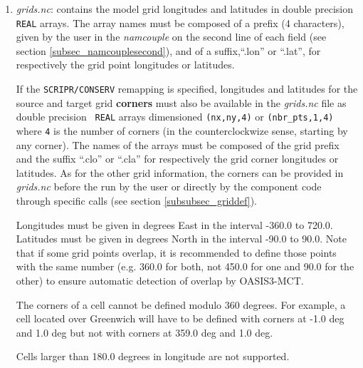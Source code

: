 \begin{enumerate}

\item {\em grids.nc}: contains the model grid longitudes and latitudes
  in double precision {\tt REAL} arrays. The array names must be
  composed of a prefix (4 characters), given by the user in the {\it
    namcouple} on the second line of each field (see section
  \ref{subsec_namcouplesecond}), and of a suffix,``.lon'' or ``.lat'', for respectively the grid point
  longitudes or latitudes.

  If the {\tt SCRIPR/CONSERV} remapping is specified, longitudes and
  latitudes for the source and target grid {\bf corners} must also be
  available in the {\em grids.nc} file as double precision {\tt
    REAL} arrays dimensioned {\tt (nx,ny,4)} or {\tt (nbr\_pts,1,4)}
  where {\tt 4} is the number of corners (in the counterclockwize
  sense, starting by any corner). The names of the arrays must be composed of the grid prefix
  and the suffix ``.clo'' or ``.cla'' for respectively the grid corner
  longitudes or latitudes.  As for the other grid information, the
  corners can be provided in {\em grids.nc} before the run by the user
  or directly by the component code through specific calls (see section
  \ref{subsubsec_griddef}).

 
  Longitudes must be given in degrees East in the interval -360.0 to
  720.0. Latitudes must be given in degrees North in the interval
  -90.0 to 90.0. Note that if some grid points overlap, it is
  recommended to define those points with the same number (e.g. 360.0
  for both, not 450.0 for one and 90.0 for the other) to ensure
  automatic detection of overlap by OASIS3-MCT.
 
  The corners of a cell cannot be defined modulo 360 degrees. For
  example, a cell located over Greenwich will have to be defined with
  corners at -1.0 deg and 1.0 deg but not with corners at 359.0 deg
  and 1.0 deg.
 
  Cells larger than 180.0 degrees in longitude are not supported.
 

\end{enumerate}
